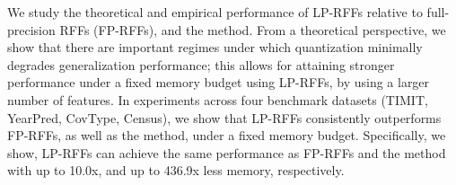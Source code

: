 

We study the theoretical and empirical performance of LP-RFFs relative to full-precision RFFs (FP-RFFs), and the \Nystrom method.  From a theoretical perspective, we show that there are important regimes under which quantization minimally degrades generalization performance; this allows for attaining stronger performance under a fixed memory budget using LP-RFFs, by using a larger number of features. In experiments across four benchmark datasets (TIMIT, YearPred, CovType, Census), we show that LP-RFFs consistently outperforms FP-RFFs, as well as the \Nystrom method, under a fixed memory budget. Specifically, we show, LP-RFFs can achieve the same performance as FP-RFFs and the \Nystrom method with up to 10.0x, and up to 436.9x less memory, respectively.

